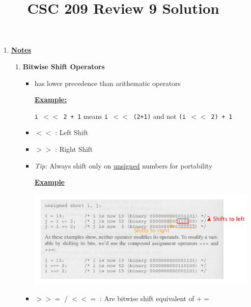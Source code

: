 \documentclass[12pt]{article}
\begin{document}
\title{CSC 209 Review 9 Solution}
\maketitle

\bigskip

\begin{enumerate}[1.]
    \item


    \bigskip

    \underline{\textbf{Notes}}

    \begin{enumerate}[1.]
        \item
        \textbf{Bitwise Shift Operators}

        \begin{itemize}
            \item has lower precedence than arithematic operators

            \bigskip

            \underline{\textbf{Example:}}

            \bigskip

            \texttt{i $<<$ 2 + 1} means \texttt{i $<<$ (2+1)} and not \texttt{(i $<<$ 2) + 1}

            \bigskip


            \item $<<$ : Left Shift
            \item $>>$ : Right Shift
            \item \textit{Tip:} Always shift only on \underline{unsigned} numbers for portability


            \bigskip

            \underline{\textbf{Example}}

            \bigskip

            \begin{center}
            \includegraphics[width=0.9\linewidth]{images/review_9_solution_1.png}
            \end{center}

            \item \texttt{$>>=$} / \texttt{$<<=$} : Are bitwise shift equivalent of \texttt{$+=$}
        \end{itemize}


    \end{enumerate}
\end{enumerate}
\end{document}

